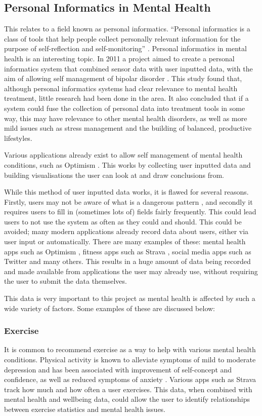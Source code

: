 \documentclass[11pt,openright,a4paper]{report}
\begin{document}
\subsection{Personal Informatics in Mental Health}
This relates to a field known as personal informatics. \enquote{Personal informatics is a class of tools that help people collect personally relevant information for the purpose of self-reflection and self-monitoring} \parencite{personalinformatics}. Personal informatics in mental health is an interesting topic. In 2011 a project aimed to create a personal informatics system that combined sensor data with user inputted data, with the aim of allowing self management of bipolar disorder \parencite{pimentalhealth}. This study found that, although personal informatics systems had clear relevance to mental health treatment, little research had been done in the area. It also concluded that if a system could fuse the collection of personal data into treatment tools in some way, this may have relevance to other mental health disorders, as well as more mild issues such as stress management and the building of balanced, productive lifestyles.

Various applications already exist to allow self management of mental health conditions, such as Optimism \parencite{optimism}. This works by collecting user inputted data and building visualisations the user can look at and draw conclusions from.

While this method of user inputted data works, it is flawed for several reasons. Firstly, users may not be aware of what is a dangerous pattern \parencite{pimentalhealth}, and secondly it requires users to fill in (sometimes lots of) fields fairly frequently. This could lead users to not use the system as often as they could and should. This could be avoided; many modern applications already record data about users, either via user input or automatically. There are many examples of these: mental health apps such as Optimism \parencite{optimism}, fitness apps such as Strava \parencite{strava}, social media apps such as Twitter \parencite{twitter} and many others. This results in a huge amount of data being recorded and made available from applications the user may already use, without requiring the user to submit the data themselves.

This data is very important to this project as mental health is affected by such a wide variety of factors. Some examples of these are discussed below:

\subsubsection{Exercise}
It is common to recommend exercise as a way to help with various mental health conditions. Physical activity is known to alleviate symptoms of mild to moderate depression and has been associated with improvement of self-concept and confidence, as well as reduced symptoms of anxiety \parencite{exercisementalhealth}. Various apps such as Strava \parencite{strava} track how much and how often a user exercises. This data, when combined with mental health and wellbeing data, could allow the user to identify relationships between exercise statistics and mental health issues.
\end{document}
